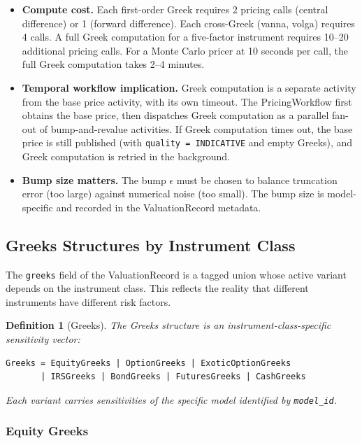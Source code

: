 \documentclass[11pt,a4paper]{article}
\newtheorem{definition}{Definition}[section]
\begin{document}
\begin{itemize}[nosep]
\item \textbf{Compute cost.}  Each first-order Greek requires 2 pricing calls (central difference) or 1 (forward difference).  Each cross-Greek (vanna, volga) requires 4 calls.  A full Greek computation for a five-factor instrument requires 10--20 additional pricing calls.  For a Monte Carlo pricer at 10 seconds per call, the full Greek computation takes 2--4 minutes.
\item \textbf{Temporal workflow implication.}  Greek computation is a separate activity from the base price activity, with its own timeout.  The PricingWorkflow first obtains the base price, then dispatches Greek computation as a parallel fan-out of bump-and-revalue activities.  If Greek computation times out, the base price is still published (with \texttt{quality = INDICATIVE} and empty Greeks), and Greek computation is retried in the background.
\item \textbf{Bump size matters.}  The bump $\epsilon$ must be chosen to balance truncation error (too large) against numerical noise (too small).  The bump size is model-specific and recorded in the ValuationRecord metadata.
\end{itemize}

\subsection{Greeks Structures by Instrument Class}

The \texttt{greeks} field of the ValuationRecord is a tagged union whose active variant depends on the instrument class.  This reflects the reality that different instruments have different risk factors.

\begin{definition}[Greeks]
\label{def:greeks}
The Greeks structure is an instrument-class-specific sensitivity vector:
\begin{lstlisting}
Greeks = EquityGreeks | OptionGreeks | ExoticOptionGreeks
       | IRSGreeks | BondGreeks | FuturesGreeks | CashGreeks
\end{lstlisting}
Each variant carries sensitivities of the \emph{specific model} identified by \texttt{model\_id}.
\end{definition}

\subsubsection{Equity Greeks}
\end{document}
